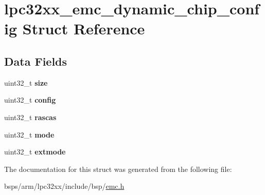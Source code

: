 \hypertarget{structlpc32xx__emc__dynamic__chip__config}{}\section{lpc32xx\+\_\+emc\+\_\+dynamic\+\_\+chip\+\_\+config Struct Reference}
\label{structlpc32xx__emc__dynamic__chip__config}
\subsection*{Data Fields}
\begin{DoxyCompactItemize}
\item 
\mbox{\label{structlpc32xx__emc__dynamic__chip__config_a635cec94f7934b65acfcdb296a959f24}} 
uint32\+\_\+t {\bfseries size}
\item 
\mbox{\label{structlpc32xx__emc__dynamic__chip__config_a993744c2e93e3cffeed9ffcab631cd27}} 
uint32\+\_\+t {\bfseries config}
\item 
\mbox{\label{structlpc32xx__emc__dynamic__chip__config_ac5d07bab32fa7e47e35471a8bf5e0d23}} 
uint32\+\_\+t {\bfseries rascas}
\item 
\mbox{\label{structlpc32xx__emc__dynamic__chip__config_a740eade72f3d79f6ca96be6937515780}} 
uint32\+\_\+t {\bfseries mode}
\item 
\mbox{\label{structlpc32xx__emc__dynamic__chip__config_a01c771d9327cd3698a99368fc9453ed6}} 
uint32\+\_\+t {\bfseries extmode}
\end{DoxyCompactItemize}


The documentation for this struct was generated from the following file\+:\begin{DoxyCompactItemize}
\item 
bsps/arm/lpc32xx/include/bsp/\mbox{\hyperlink{emc_8h}{emc.\+h}}\end{DoxyCompactItemize}
